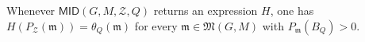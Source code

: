 Whenever \(\mathsf{MID}(G,M,\mathcal Z,Q)\) returns an expression \(H\), one has \(H(P_{\mathcal Z}(\mathfrak m))=\theta_Q(\mathfrak m)\) for every \(\mathfrak m\in\mathfrak M(G,M)\) with \(P_{\mathfrak m}(B_Q)>0\).